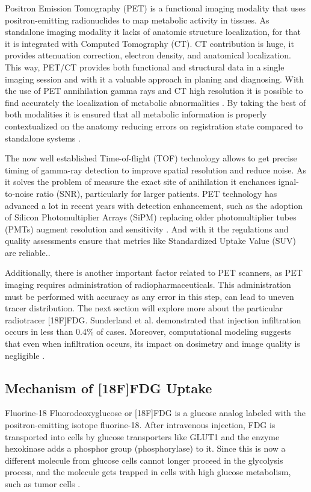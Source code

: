 \documentclass[11pt]{article} %
\begin{document}
Positron Emission Tomography (PET) is a functional imaging modality that uses positron-emitting radionuclides to map metabolic activity in tissues. As standalone imaging modality it lacks of anatomic structure localization, for that it is integrated with Computed Tomography (CT). CT contribution is huge, it provides attenuation correction, electron density, and anatomical localization. This way, PET/CT provides both functional and structural data in a single imaging session and with it a valuable approach in planing and diagnosing. With the use of PET annihilation gamma rays and CT high resolution it is possible to find accurately the localization of metabolic abnormalities \cite{TG174}. By taking the best of both modalities it is ensured that all metabolic information is properly contextualized on the anatomy reducing errors on registration state compared to standalone systems \cite{TG126}.


The now well established Time-of-flight (TOF) technology allows to get precise timing of gamma-ray detection to improve spatial resolution and reduce noise. As it solves the problem of measure the exact site of anihilation it enchances ignal-to-noise ratio (SNR), particularly for larger patients. \cite{Seifert2022} PET technology has advanced a lot in recent years with detection enhancement, such as the adoption of Silicon Photomultiplier Arrays (SiPM) replacing older photomultiplier tubes (PMTs) augment resolution and sensitivity \cite{SunderlandSeminar}. And with it the regulations and quality assessments ensure that metrics like Standardized Uptake Value (SUV) are reliable.\cite{TG174}.

Additionally, there is another important factor related to PET scanners, as PET imaging requires administration of radiopharmaceuticals. This administration must be performed with accuracy as any error in this step, can lead to uneven tracer distribution. The next section will explore more about the particular radiotracer [18F]FDG. Sunderland et al. demonstrated that injection infiltration occurs in less than 0.4\% of cases. Moreover, computational modeling suggests that even when infiltration occurs, its impact on dosimetry and image quality is negligible  \cite{Sunderland2023}. 


\subsection{Mechanism of [18F]FDG Uptake}


Fluorine-18 Fluorodeoxyglucose or [18F]FDG is a glucose analog labeled with the positron-emitting isotope fluorine-18. After intravenous injection, FDG is transported into cells by glucose transporters like GLUT1 and  the enzyme hexokinase adds a phosphor group (phosphorylase) to it. Since this is now a different molecule from glucose cells cannot longer proceed in the glycolysis process, and the molecule gets trapped in cells with high glucose metabolism, such as tumor cells \cite{TG174, Zheng2018}.
\end{document}
